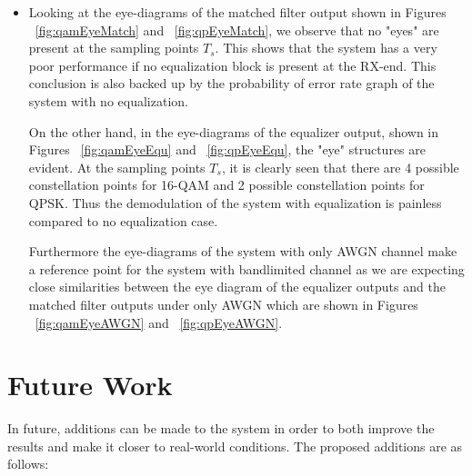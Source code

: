 \documentclass[]{article}
\begin{document}
\begin{itemize}
\item Looking at the eye-diagrams of the matched filter output shown in Figures ~\ref{fig:qamEyeMatch} and ~\ref{fig:qpEyeMatch}, we observe that no "eyes" are present at the sampling points $T_s$. This shows that the system has a very poor performance if no equalization block is present at the RX-end. This conclusion is also backed up by the probability of error rate graph of the system with no equalization. 

On the other hand, in the eye-diagrams of the equalizer output, shown in Figures ~\ref{fig:qamEyeEqu} and ~\ref{fig:qpEyeEqu}, the "eye" structures are evident. At the sampling points $T_s$, it is clearly seen that there are 4 possible constellation points for 16-QAM and 2 possible constellation points for QPSK. Thus the demodulation of the system with equalization is painless compared to no equalization case.  

Furthermore the eye-diagrams of the system with only AWGN channel make a reference point for the system with bandlimited channel as we are expecting close similarities between the eye diagram of the equalizer outputs and the matched filter outputs under only AWGN which are shown in Figures ~\ref{fig:qamEyeAWGN} and ~\ref{fig:qpEyeAWGN}. 




\end{itemize}



\section{Future Work}

In future, additions can be made to the system in order to both improve  the results and make it closer to real-world conditions. The proposed additions are as follows:
\end{document}
